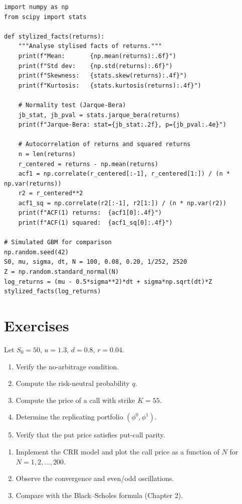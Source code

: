 \begin{codeblock}[title=\textbf{Stylised Facts Analysis}]
\begin{verbatim}
import numpy as np
from scipy import stats

def stylized_facts(returns):
    """Analyse stylised facts of returns."""
    print(f"Mean:       {np.mean(returns):.6f}")
    print(f"Std dev:    {np.std(returns):.6f}")
    print(f"Skewness:   {stats.skew(returns):.4f}")
    print(f"Kurtosis:   {stats.kurtosis(returns):.4f}")

    # Normality test (Jarque-Bera)
    jb_stat, jb_pval = stats.jarque_bera(returns)
    print(f"Jarque-Bera: stat={jb_stat:.2f}, p={jb_pval:.4e}")

    # Autocorrelation of returns and squared returns
    n = len(returns)
    r_centered = returns - np.mean(returns)
    acf1 = np.correlate(r_centered[:-1], r_centered[1:]) / (n * np.var(returns))
    r2 = r_centered**2
    acf1_sq = np.correlate(r2[:-1], r2[1:]) / (n * np.var(r2))
    print(f"ACF(1) returns:  {acf1[0]:.4f}")
    print(f"ACF(1) squared:  {acf1_sq[0]:.4f}")

# Simulated GBM for comparison
np.random.seed(42)
S0, mu, sigma, dt, N = 100, 0.08, 0.20, 1/252, 2520
Z = np.random.standard_normal(N)
log_returns = (mu - 0.5*sigma**2)*dt + sigma*np.sqrt(dt)*Z
stylized_facts(log_returns)
\end{verbatim}
\end{codeblock}

\section{Exercises}

\begin{exercise}
Let $S_0 = 50$, $u = 1.3$, $d = 0.8$, $r = 0.04$.
\begin{enumerate}
    \item Verify the no-arbitrage condition.
    \item Compute the risk-neutral probability $q$.
    \item Compute the price of a call with strike $K = 55$.
    \item Determine the replicating portfolio $(\phi^0, \phi^1)$.
    \item Verify that the put price satisfies put-call parity.
\end{enumerate}
\end{exercise}

\begin{exercise}
\begin{enumerate}
    \item Implement the CRR model and plot the call price as a function
          of $N$ for $N = 1, 2, \ldots, 200$.
    \item Observe the convergence and even/odd oscillations.
    \item Compare with the Black--Scholes formula (Chapter 2).
\end{enumerate}
\end{exercise}

